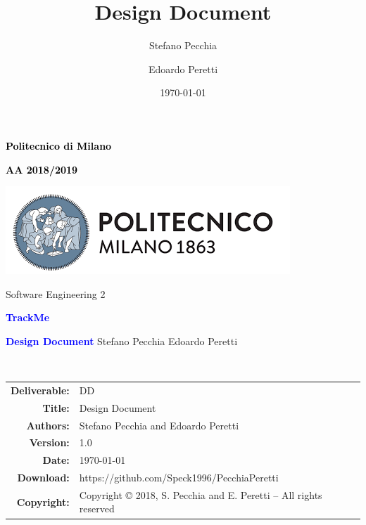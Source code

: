 \documentclass[a4paper,11pt]{report}
\title{Design Document}
\author{Stefano Pecchia \and Edoardo Peretti}
\date{\today}
\begin{document}
\begin{titlepage}
\centering

\textcolor{black}{\textbf{Politecnico di Milano}} \par
\textcolor{black}{\textbf{AA 2018/2019}} \par  \vspace{2em}
\includegraphics[scale=0.7]{resources/PolimiLogo}\par \vspace{1em}

Software Engineering 2 \par \vspace{1.5cm}
\textcolor{Blue}{\Large\textbf{TrackMe}} \par \vspace{3cm}

{\textcolor{Blue}{\textbf{\Huge{Design Document}}}} \vfill
Stefano Pecchia \hspace{5em} Edoardo Peretti \vspace{4cm}
\end{titlepage}


\
\begin{table}[h!]
\centering
\begin{tabular}{rl}
\hline
\textbf{Deliverable:} & DD\\
\textbf{Title:} & Design Document \\
\textbf{Authors:} & Stefano Pecchia and Edoardo Peretti\\
\textbf{Version:} & 1.0 \\ 
\textbf{Date:} & \today \\
\textbf{Download:} & https://github.com/Speck1996/PecchiaPeretti \\
\textbf{Copyright:} & Copyright © 2018, S. Pecchia and E. Peretti – All rights reserved \\
\hline
\end{tabular}
\end{table}



\tableofcontents








\end{document}
